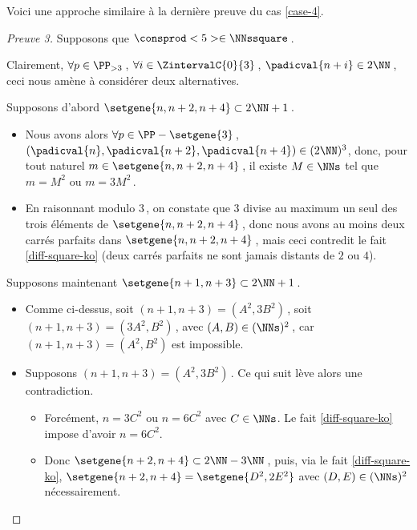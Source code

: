 

Voici une approche similaire à la dernière preuve du cas \ref{case-4}.
	
	
\begin{proof}[Preuve 3]
    Supposons que $\consprod<5> \in \NNssquare$\,.
    
    \smallskip
    
	Clairement, $\forall p \in \PP_{>3}$\,, 
   	$\forall i \in \ZintervalC{0}{3}$\,, 
    $\padicval{n + i} \in 2 \NN$\,,
    ceci nous amène à considérer deux alternatives.
    
    \medskip
    
    Supposons d'abord $\setgene{n, n + 2, n + 4} \subset 2 \NN + 1$\,.
	\begin{itemize}
		\item
		Nous avons alors
		$\forall p \in \PP - \setgene{3}$\,, 
   		$(\padicval{n}, \padicval{n+2}, \padicval{n+4}) \in ( 2 \NN )^3$,
		donc, pour tout naturel $m \in \setgene{n, n + 2, n + 4}$\,, 
		il existe $M \in \NNs$ tel que 
		$m = M^2$ ou $m = 3 M^2$\,.
	
		\item En raisonnant modulo $3$\,, on constate que $3$ divise au maximum un seul des trois éléments de $\setgene{n, n + 2, n + 4}$\,, donc nous avons au moins deux carrés parfaits dans $\setgene{n, n + 2, n + 4}$\,, mais ceci contredit le fait \ref{diff-square-ko} (deux carrés parfaits ne sont jamais distants de $2$ ou $4$).
    \end{itemize}
    
    \medskip
    
    Supposons maintenant $\setgene{n + 1, n + 3} \subset 2 \NN + 1$\,.
	\begin{itemize}
		\item
		Comme ci-dessus,
		soit $(n + 1, n + 3) = (A^2, 3 B^2)$\,,
		soit $(n + 1, n + 3) = (3 A^2, B^2)$\,,
		avec $(A, B) \in ( \NNs )^2$\,,
		car $(n + 1, n + 3) = (A^2, B^2)$ est impossible.
	
		\item Supposons $(n + 1, n + 3) = (A^2, 3 B^2)$\,. Ce qui suit lève alors une contradiction.
		\begin{itemize}
			\item Forcément, $n = 3 C^2$ ou $n = 6 C^2$ avec $C \in \NNs$.
			Le fait \ref{diff-square-ko} impose d'avoir $n = 6 C^2$.

			\item Donc 
			$\setgene{n + 2, n + 4} \subset 2 \NN - 3 \NN$\,, 
			puis, via le fait \ref{diff-square-ko},
			$\setgene{n + 2, n + 4} = \setgene{D^2, 2 E^2}$ 
			avec $(D, E) \in ( \NNs )^2$ nécessairement.


\end{itemize}
\end{itemize}
\end{proof}
